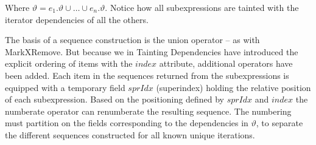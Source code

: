 Where $\vartheta=e_{1}.\vartheta \cup \ldots \cup e_{n}.\vartheta$. Notice how all subexpressions are tainted with
the iterator dependencies of all the others.

The basis of a sequence construction is the \textsf{union} operator -- as with MarkXRemove. But because we in
Tainting Dependencies have introduced the explicit ordering of items with the
$index$ attribute, additional operators have been added. Each item in the sequences returned from the subexpressions is equipped with a
temporary field $sprIdx$ (superindex) holding the relative position of each subexpression. Based on the
positioning defined by $sprIdx$ and $index$ the \textsf{numberate} operator can renumberate the resulting
sequence. The numbering must partition on the fields corresponding to the dependencies in $\vartheta$, to separate
the different sequences constructed for all known unique iterations.

